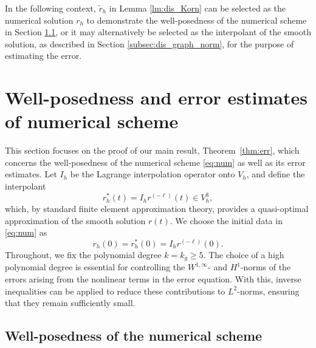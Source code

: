 \documentclass[11pt,a4paper,oneside,reqno]{amsart}
\theoremstyle{definition}
\theoremstyle{plain}
\numberwithin{theorem}{section}
\numberwithin{proposition}{section}
\numberwithin{lemma}{section}
\numberwithin{equation}{section}
\begin{document}
In the following context, \( \tilde{r}_h \) in Lemma \ref{lm:dis_Korn} can be selected as the numerical solution \( r_h \) to demonstrate the well-posedness of the numerical scheme in Section \ref{subsec:wellpose_num}, or it may alternatively be selected as the interpolant of the smooth solution, as described in Section \ref{subsec:dis_graph_norm}, for the purpose of estimating the error.


\section{Well-posedness and error estimates of numerical scheme}\label{sec:pf_main}
This section focuses on the proof of our main result, Theorem~\ref{thm:err}, which concerns the well-posedness of the numerical scheme \eqref{eq:num} as well as its error estimates.
Let \(I_h\) be the Lagrange interpolation operator onto \(V_h\), and define the interpolant
\[r_h^*(t)=I_h r^{(-\ell)}(t)\in V_h^3,\] 
which, by standard finite element approximation theory,
provides a quasi-optimal approximation of the smooth solution \(r(t)\).
We choose the initial data in \eqref{eq:num} as
\begin{equation}\label{eq:ini_data}
r_h(0)=r_h^*(0)=I_h r^{(-\ell)}(0).
\end{equation}
Throughout, we fix the polynomial degree $k=k_g\ge 5$.
The choice of a high polynomial degree is essential for controlling the \(W^{1,\infty}\)- and \(H^1\)-norms
of the errors arising from the nonlinear terms in the error equation.
With this, inverse inequalities can be applied to reduce these contributions to \(L^2\)-norms, ensuring that they remain sufficiently small.



\subsection{Well-posedness of the numerical scheme}\label{subsec:wellpose_num}
\end{document}
